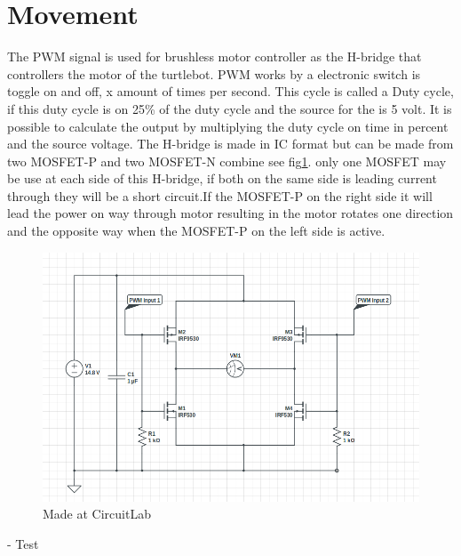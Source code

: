 %
%
%
%
\section{Movement}
The PWM signal is used for brushless motor controller as the H-bridge that controllers the motor of the turtlebot. PWM works by a electronic switch is toggle on and off, x amount of times per second. This cycle is called a Duty cycle, if this duty cycle is on 25\% of the duty cycle and the source for the is 5 volt. It is possible to calculate the output by multiplying the duty cycle on time in percent and the source voltage. The H-bridge is made in IC format but can be made from two MOSFET-P and two MOSFET-N combine see fig\ref{fig:Hbridge}. only one MOSFET may be use at each side of this H-bridge, if both on the same side is leading current through they will be a short circuit.If the MOSFET-P on the right side it will lead the power on way through motor resulting in the motor rotates one direction and the opposite way when the MOSFET-P on the left side is active\cite{H-bridge}. 
\begin{figure}
    \centering
    \includegraphics[width=.7\textwidth]{figures/H-brige.png}
    \caption{Made at CircuitLab} 
    \label{fig:Hbridge} 
\end{figure}

- Test